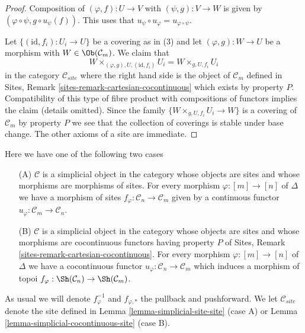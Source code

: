\begin{proof}
Composition of $(\varphi, f) : U \to V$ with $(\psi, g) : V \to W$
is given by $(\varphi \circ \psi, g \circ u_\psi(f))$.
This uses that $u_\psi \circ u_\varphi = u_{\varphi \circ \psi}$.

\medskip\noindent
Let $\{(\text{id}, f_i) :  U_i \to U\}$ be a covering as in (3)
and let $(\varphi, g) : W \to U$ be a morphism with
$W \in \Ob(\mathcal{C}_m)$. We claim that
$$
W \times_{(\varphi, g), U, (\text{id}, f_i)} U_i =
W \times_{g, U, f_i} U_i
$$
in the category $\mathcal{C}_{site}$ where the right hand side
is the object of $\mathcal{C}_m$ defined in
Sites, Remark \ref{sites-remark-cartesian-cocontinuous}
which exists by property $P$. Compatibility of this type of fibre product
with compositions of functors implies the claim (details omitted).
Since the family $\{W \times_{g, U, f_i} U_i \to W\}$ is a
covering of $\mathcal{C}_m$ by property $P$ we see that
the collection of coverings is stable under base
change. The other axioms of a site are immediate.
\end{proof}

\begin{situation}
\label{situation-simplicial-site}
Here we have one of the following two cases
\begin{enumerate}
\item[(A)] $\mathcal{C}$ is a simplicial object in the category whose
objects are sites and whose morphisms are morphisms of sites. For every
morphism $\varphi : [m] \to [n]$ of $\Delta$ we have a morphism of sites
$f_\varphi : \mathcal{C}_n \to \mathcal{C}_m$ given by a continuous
functor $u_\varphi : \mathcal{C}_m \to \mathcal{C}_n$.
\item[(B)] $\mathcal{C}$ is a simplicial object in the category whose
objects are sites and whose morphisms are cocontinuous functors having
property $P$ of Sites, Remark \ref{sites-remark-cartesian-cocontinuous}.
For every morphism $\varphi : [m] \to [n]$ of $\Delta$ we have a cocontinuous
functor $u_\varphi : \mathcal{C}_n \to \mathcal{C}_m$ which induces a
morphism of topoi $f_\varphi : \Sh(\mathcal{C}_n) \to \Sh(\mathcal{C}_m)$.
\end{enumerate}
As usual we will denote $f_\varphi^{-1}$ and $f_{\varphi, *}$ the
pullback and pushforward. We let $\mathcal{C}_{site}$ denote the
site defined in
Lemma \ref{lemma-simplicial-site-site} (case A) or
Lemma \ref{lemma-simplicial-cocontinuous-site} (case B).
\end{situation}

